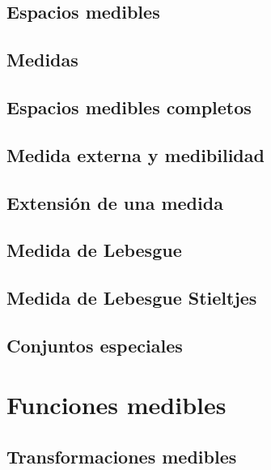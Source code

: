 \documentclass[12pt,]{krantz}
\theoremstyle{definition}
\theoremstyle{definition}
\theoremstyle{definition}
\theoremstyle{remark}
\begin{document}
\section{Espacios medibles}\label{espacios-medibles}

\section{Medidas}\label{medidas}

\section{Espacios medibles completos}\label{espacios-medibles-completos}

\section{Medida externa y
medibilidad}\label{medida-externa-y-medibilidad}

\section{Extensión de una medida}\label{extension-de-una-medida}

\section{Medida de Lebesgue}\label{medida-de-lebesgue}

\section{Medida de Lebesgue
Stieltjes}\label{medida-de-lebesgue-stieltjes}

\section{Conjuntos especiales}\label{conjuntos-especiales}

\chapter{Funciones medibles}\label{funciones-medibles}

\section{Transformaciones medibles}\label{transformaciones-medibles}
\end{document}
